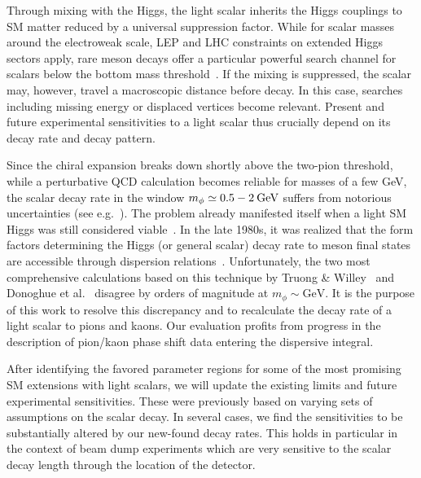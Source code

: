 \documentclass[preprintnumbers,twocolumn,aps,floats,nofootinbib]{revtex4-1}
\newcommand{\eVdist}{\kern-0.06em}
\newcommand{\gev}{\:\text{Ge\eVdist V}}
\begin{document}
Through mixing with the Higgs, the light scalar inherits the Higgs couplings to SM matter reduced by a universal suppression factor. While for scalar masses around the electroweak scale, LEP and LHC constraints on extended Higgs sectors apply, rare meson decays offer a particular powerful search channel for scalars below the bottom mass threshold~\cite{Willey:1982mc}.
If the mixing is suppressed, the scalar may, however, travel a macroscopic distance before decay. In this case, searches including missing energy or displaced vertices become relevant. Present and future experimental sensitivities to a light scalar thus crucially depend on its decay rate and decay pattern. 

Since the chiral expansion breaks down shortly above the two-pion threshold, while a perturbative QCD calculation becomes reliable for masses of a few GeV, the scalar decay rate in the window $m_\phi \simeq 0.5-2\gev$ suffers from notorious uncertainties (see e.g.~\cite{Clarke:2013aya}). The problem already manifested itself when a light SM Higgs was still considered viable~\cite{Gunion:1989we}. In the late 1980s, it was realized that the form factors determining the Higgs (or general scalar) decay rate to meson final states are accessible through dispersion relations~\cite{Raby:1988qf}. Unfortunately, the two most comprehensive calculations based on this technique by Truong \& Willey~\cite{Truong:1989my} and Donoghue et al.~\cite{Donoghue:1990xh} disagree by orders of magnitude at $m_\phi\sim\text{GeV}$. It is the purpose of this work to resolve this discrepancy and to recalculate the decay rate of a light scalar to pions and kaons. Our evaluation profits from progress in the description of pion/kaon phase shift data entering the dispersive integral.

After identifying the favored parameter regions for some of the most promising SM extensions with light scalars, we will update the existing limits and future experimental sensitivities. These were previously based on varying sets of assumptions on the scalar decay. In several cases, we find the sensitivities to be substantially altered by our new-found decay rates. This holds in particular in the context of beam dump experiments which are very sensitive to the scalar decay length through the location of the detector.
\end{document}
